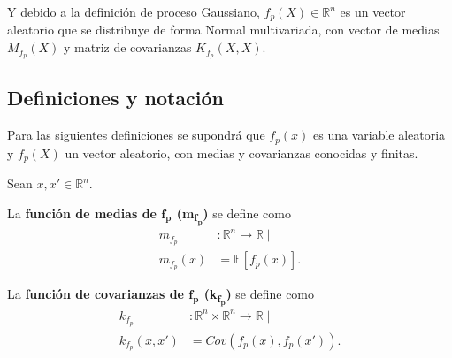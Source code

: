 Y debido a la definici\'on de proceso Gaussiano, $f_p(X) \in \mathbb{R}^n$ es un vector aleatorio que se distribuye de forma Normal multivariada, con vector de medias $M_{f_p}(X)$ y matriz de covarianzas $K_{f_p}(X,X)$.


\subsection{Definiciones y notaci\'on}

Para las siguientes definiciones se supondrá que $f_p(x)$ es una variable aleatoria y $f_p(X)$ un vector aleatorio, con medias y covarianzas conocidas y finitas.

\begin{defin*}
Sean $x,x' \in \mathbb{R}^n$.

La \textbf{función de medias de $\bm{f_p}$ (m\textsubscript{$\bm{f_p}$})} se define como 
\begin{equation*}
\begin{aligned}
    m_{f_p}&: \mathbb{R}^n \rightarrow \mathbb{R} 
    \mid\\
    m_{f_p}(x) &= \mathbb{E}[f_p(x)].
\end{aligned}
\end{equation*}

La \textbf{función de covarianzas de $\bm{f_p}$ (k\textsubscript{$\bm{f_p}$})} se define como 
\begin{equation*}
\begin{aligned}
    k_{f_p}&: \mathbb{R}^n \times \mathbb{R}^n \rightarrow \mathbb{R} 
    \mid\\
    k_{f_p}(x, x') &= Cov({f_p}(x),{f_p}(x')).
\end{aligned}
\end{equation*}
\end{defin*}

